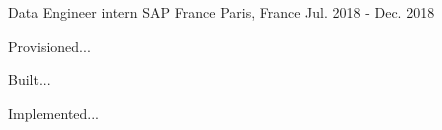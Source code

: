

\begin{cventries}

  \cventry
    {Data Engineer intern} %
    {SAP France} %
    {Paris, France} %
    {Jul. 2018 - Dec. 2018} %
    {
      \begin{cvitems} %
        \item {Provisioned...}
        \item {Built...}
        \item {Implemented...}
      \end{cvitems}
    }
\end{cventries}
